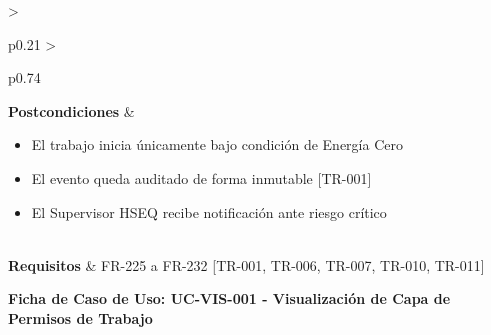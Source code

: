 \begin{longtable}{>{\raggedright\arraybackslash}p{0.21\textwidth} >{\raggedright\arraybackslash}p{0.74\textwidth}}
\textbf{Postcondiciones} & \parbox[t]{\linewidth}{\vspace{2pt} \begin{itemize}[leftmargin=1.5em, nosep, topsep=0pt]
\item El trabajo inicia únicamente bajo condición de Energía Cero
\item El evento queda auditado de forma inmutable [TR-001]
\item El Supervisor HSEQ recibe notificación ante riesgo crítico
\end{itemize} \vspace{2pt}} \\
\textbf{Requisitos} & FR-225 a FR-232 [TR-001, TR-006, TR-007, TR-010, TR-011] \\ \bottomrule
\end{longtable}\normalsize\vspace{1em}
\noindent\textbf{Ficha de Caso de Uso: UC-VIS-001 - Visualización de Capa de Permisos de Trabajo}
\footnotesize\setlength{\tabcolsep}{4pt}\renewcommand{\arraystretch}{1.2}
